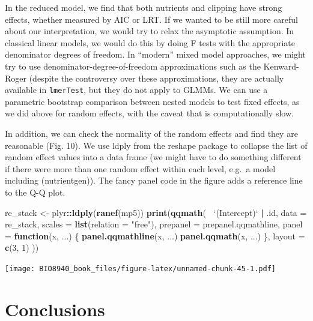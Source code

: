 \documentclass[
  12pt,
]{book}
\newenvironment{Shaded}{\begin{snugshade}}{\end{snugshade}}
\newcommand{\ControlFlowTok}[1]{\textcolor[rgb]{0.13,0.29,0.53}{\textbf{#1}}}
\newcommand{\DataTypeTok}[1]{\textcolor[rgb]{0.13,0.29,0.53}{#1}}
\newcommand{\DecValTok}[1]{\textcolor[rgb]{0.00,0.00,0.81}{#1}}
\newcommand{\KeywordTok}[1]{\textcolor[rgb]{0.13,0.29,0.53}{\textbf{#1}}}
\newcommand{\NormalTok}[1]{#1}
\newcommand{\OperatorTok}[1]{\textcolor[rgb]{0.81,0.36,0.00}{\textbf{#1}}}
\newcommand{\StringTok}[1]{\textcolor[rgb]{0.31,0.60,0.02}{#1}}
\begin{document}
In the reduced model, we find that both nutrients and clipping have strong effects, whether measured by AIC or LRT. If we wanted to be still more careful about our interpretation, we would try to relax the asymptotic assumption. In classical linear models, we would do this by doing F tests with the appropriate denominator degrees of freedom. In ``modern'' mixed model approaches, we might try to use denominator-degree-of-freedom approximations such as the Kenward-Roger (despite the controversy over these approximations, they are actually available in \texttt{lmerTest}, but they do not apply to GLMMs. We can use a parametric bootstrap comparison between nested models to test fixed effects, as we did above for random effects, with the caveat that is computationally slow.

In addition, we can check the normality of the random effects and find they are reasonable (Fig. 10). We use ldply from the reshape package to collapse the list of random effect values into a data frame (we might have to do something different if there were more than one random effect within each level, e.g.~a model including (nutrient\textbar gen)). The fancy panel code in the figure adds a reference line to the Q-Q plot.

\begin{Shaded}
\begin{Highlighting}[]
\NormalTok{re_stack <-}\StringTok{ }\NormalTok{plyr}\OperatorTok{::}\KeywordTok{ldply}\NormalTok{(}\KeywordTok{ranef}\NormalTok{(mp5))}
\KeywordTok{print}\NormalTok{(}\KeywordTok{qqmath}\NormalTok{(}\OperatorTok{~}\StringTok{ `}\DataTypeTok{(Intercept)}\StringTok{`} \OperatorTok{|}\StringTok{ }\NormalTok{.id,}
  \DataTypeTok{data =}\NormalTok{ re_stack, }\DataTypeTok{scales =} \KeywordTok{list}\NormalTok{(}\DataTypeTok{relation =} \StringTok{"free"}\NormalTok{),}
  \DataTypeTok{prepanel =}\NormalTok{ prepanel.qqmathline,}
  \DataTypeTok{panel =} \ControlFlowTok{function}\NormalTok{(x, ...) \{}
    \KeywordTok{panel.qqmathline}\NormalTok{(x, ...)}
    \KeywordTok{panel.qqmath}\NormalTok{(x, ...)}
\NormalTok{  \},}
  \DataTypeTok{layout =} \KeywordTok{c}\NormalTok{(}\DecValTok{3}\NormalTok{, }\DecValTok{1}\NormalTok{)}
\NormalTok{))}
\end{Highlighting}
\end{Shaded}

\texttt{[image: BIO8940\_book\_files/figure-latex/unnamed-chunk-45-1.pdf]}

\hypertarget{conclusions}{%
\section{Conclusions}\label{conclusions}}
\end{document}
